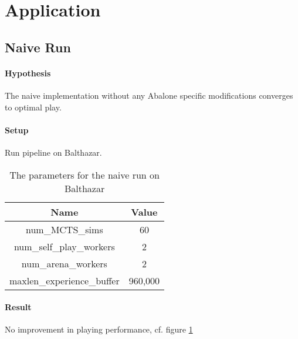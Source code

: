 \section{Application}
\subsection{Naive Run}
\paragraph{Hypothesis} The naive implementation without any Abalone specific modifications converges to optimal play.
\paragraph{Setup} Run pipeline on Balthazar.

\begin{table}[!h]
    \begin{center}
        \begin{tabular}{ c|c }
            Name                       & Value   \\
            \hline
            \hline
            num\_MCTS\_sims            & 60      \\
            num\_self\_play\_workers   & 2       \\
            num\_arena\_workers        & 2       \\
            maxlen\_experience\_buffer & 960,000 \\
        \end{tabular}
    \end{center}
    \caption{The parameters for the naive run on Balthazar}
\end{table}

\paragraph{Result} No improvement in playing performance, cf. figure \ref{performance_local_naive}
\begin{figure}[!h]
    \centering
    \hfill
    \caption{}
    \label{performance_local_naive}
\end{figure}

